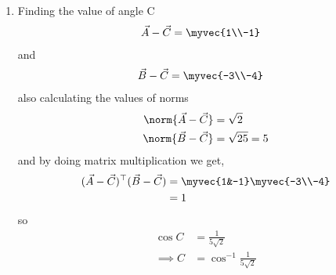 \documentclass[11pt]{book}
\begin{document}
\begin{enumerate}[label=\thesection.\arabic*.,ref=\thesection.\theenumi]
\begin{enumerate}
\item Finding the value of angle C
\begin{align}
	\vec{A}-\vec{C} &=\myvec{1\\-1}
\end{align}
and 
\begin{align}
	\vec{B}-\vec{C}&= \myvec{-3\\-4}
\end{align}
also calculating the values of norms
\begin{align}
	\norm{\vec{A}-\vec{C}} &= \sqrt{2}\\
	\norm{\vec{B}-\vec{C}} &= \sqrt{25} =5
\end{align}
and by doing matrix multiplication we get,
\begin{align}
\begin{split}
	(\vec{A}-\vec{C})^{\top}(\vec{B}-\vec{C})&=\myvec{1&-1}\myvec{-3\\-4}\\
	&=1
\end{split}
\end{align}
so 
\begin{align}
\cos{C}&= \frac{1}{ 5 \sqrt{2}}\\
	\implies C&=\cos^{-1}{\frac{1}{5 \sqrt{2}}}
\end{align}

\end{enumerate}


\end{enumerate}









%
\end{document}
